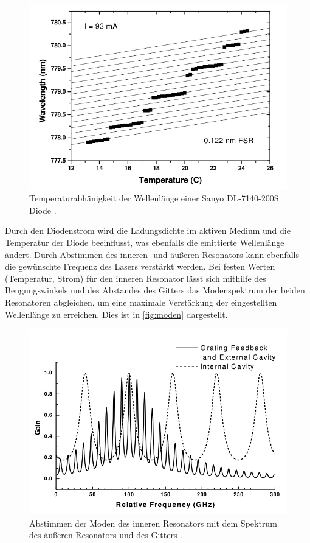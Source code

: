 \begin{figure}
    \centering
    \includegraphics[scale=0.55]{content/pics/temperatur.png}
    \caption{Temperaturabhänigkeit der Wellenlänge einer Sanyo DL-7140-200S Diode \cite{diode_laser_spectroscopy}.}
    \label{fig:temperatur}
\end{figure}
Durch den Diodenstrom wird die Ladungsdichte im aktiven Medium und die Temperatur der Diode beeinflusst, was ebenfalls die emittierte Wellenlänge ändert.
Durch Abstimmen des inneren- und äußeren Resonators kann ebenfalls die gewünschte Frequenz des Lasers verstärkt werden. Bei festen Werten (Temperatur, Strom) für den inneren 
Resonator lässt sich mithilfe des Beugungswinkels und des Abstandes des Gitters das Modenspektrum der beiden Resonatoren abgleichen, um eine maximale Verstärkung der 
eingestellten Wellenlänge zu erreichen. Dies ist in \autoref{fig:moden} dargestellt.

\begin{figure}
    \centering
    \includegraphics[scale=0.55]{content/pics/moden.png}
    \caption{Abstimmen der Moden des inneren Resonators mit dem Spektrum des äußeren Resonators und des Gitters \cite{diode_laser_spectroscopy}.}
    \label{fig:moden}
\end{figure}

